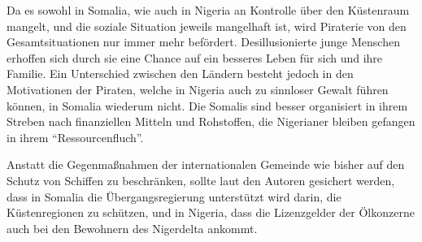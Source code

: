 \documentclass[a4paper, 12pt]{article}
\begin{document}
\begin{onehalfspace}
Da es sowohl in Somalia, wie auch in Nigeria an Kontrolle über den Küstenraum mangelt, und die soziale Situation jeweils mangelhaft ist, wird Piraterie von den Gesamtsituationen nur immer mehr befördert. Desillusionierte junge Menschen erhoffen sich durch sie eine Chance auf ein besseres Leben für sich und ihre Familie. Ein Unterschied zwischen den Ländern besteht jedoch in den Motivationen der Piraten, welche in Nigeria auch zu sinnloser Gewalt führen können, in Somalia wiederum nicht. Die Somalis sind besser organisiert in ihrem Streben nach finanziellen Mitteln und Rohstoffen, die Nigerianer bleiben gefangen in ihrem "`Ressourcenfluch"'.


Anstatt die Gegenmaßnahmen der internationalen Gemeinde wie bisher auf den Schutz von Schiffen zu beschränken, sollte laut den Autoren gesichert werden, dass in Somalia die Übergangsregierung unterstützt wird darin, die Küstenregionen zu schützen, und in Nigeria, dass die Lizenzgelder der Ölkonzerne auch bei den Bewohnern des Nigerdelta ankommt. 




\end{onehalfspace}
\nocite{*}
%
\printbibliography
\end{document}
